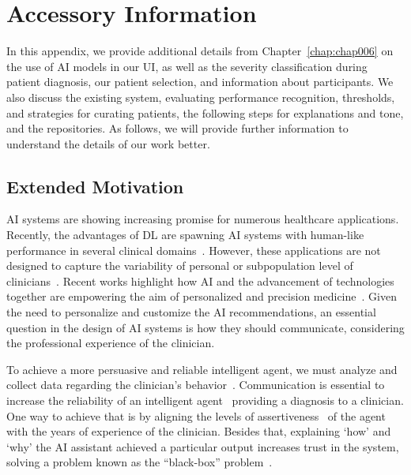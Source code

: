 \chapter{Accessory Information}
\label{chap:app005}

In this appendix, we provide additional details from Chapter~\ref{chap:chap006} on the use of \ac{AI} models in our \ac{UI}, as well as the severity classification during patient diagnosis, our patient selection, and information about participants.
We also discuss the existing system, evaluating performance recognition, thresholds, and strategies for curating patients, the following steps for explanations and tone, and the repositories.
As follows, we will provide further information to understand the details of our work better.

\section{Extended Motivation}
\label{sec:app005001}

\ac{AI} systems are showing increasing promise for numerous healthcare applications.
Recently, the advantages of \ac{DL} are spawning \ac{AI} systems with human-like performance in several clinical domains~\cite{CALISTO2022102285, Hannun2019, Ruamviboonsuk2019, Stephansen2018}.
However, these applications are not designed to capture the variability of personal or subpopulation level of clinicians~\cite{Uddin2019}.
Recent works highlight how \ac{AI} and the advancement of technologies together are empowering the aim of personalized and precision medicine~\cite{Subramanian2020, HO2020497, Wetzstein2020}.
Given the need to personalize and customize the \ac{AI} recommendations, an essential question in the design of \ac{AI} systems is how they should communicate, considering the professional experience of the clinician.

To achieve a more persuasive and reliable intelligent agent, we must analyze and collect data regarding the clinician's behavior~\cite{PELAU2021106855}.
Communication is essential to increase the reliability of an intelligent agent~\cite{10.1145/3311350.3347162} providing a diagnosis to a clinician.
One way to achieve that is by aligning the levels of assertiveness~\cite{pacheco2019alignment} of the agent with the years of experience of the clinician.
Besides that, explaining `how' and `why' the \ac{AI} assistant achieved a particular output increases trust in the system, solving a problem known as the ``black-box'' problem~\cite{10.1145/3491102.3502104, CALISTO2021102607}.

